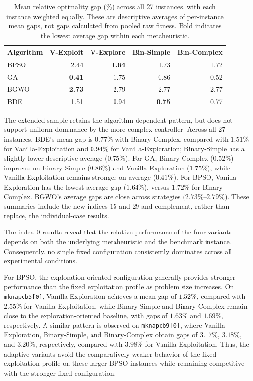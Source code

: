 \documentclass[journal,article,submit,moreauthors]{Definitions/mdpi}
\begin{document}
\begin{table}[htbp]
  \centering
  \small
  \caption{Mean relative optimality gap (\%) across all 27 instances,
  with each instance weighted equally. These are descriptive averages of
  per-instance mean gaps, not gaps calculated from pooled raw fitness.
  Bold indicates the lowest average gap within each metaheuristic.}
  \label{tab:gap_all_instances}
  \begin{tabular}{lrrrr}
    \toprule
    Algorithm & V-Exploit & V-Explore & Bin-Simple & Bin-Complex \\
    \midrule
    BPSO & 2.44 & \textbf{1.64} & 1.73 & 1.72 \\
    GA & \textbf{0.41} & 1.75 & 0.86 & 0.52 \\
    BGWO & \textbf{2.73} & 2.79 & 2.77 & 2.77 \\
    BDE & 1.51 & 0.94 & \textbf{0.75} & 0.77 \\
    \bottomrule
  \end{tabular}
\end{table}

The extended sample retains the algorithm-dependent pattern, but does not
support uniform dominance by the more complex controller. Across all 27
instances, BDE's mean gap is $0.77\%$ with Binary-Complex, compared with
$1.51\%$ for Vanilla-Exploitation and $0.94\%$ for Vanilla-Exploration;
Binary-Simple has a slightly lower descriptive average ($0.75\%$).
For GA, Binary-Complex ($0.52\%$) improves on Binary-Simple ($0.86\%$)
and Vanilla-Exploration ($1.75\%$), while Vanilla-Exploitation remains
stronger on average ($0.41\%$). For BPSO, Vanilla-Exploration has the
lowest average gap ($1.64\%$), versus $1.72\%$ for Binary-Complex.
BGWO's average gaps are close across strategies ($2.73\%$--$2.79\%$).
These summaries include the new indices $15$ and $29$ and complement,
rather than replace, the individual-case results.

The index-$0$ results reveal that the relative performance of the four variants depends
on both the underlying metaheuristic and the benchmark instance. Consequently,
no single fixed configuration consistently dominates across all experimental
conditions.

For BPSO, the exploration-oriented configuration generally provides stronger
performance than the fixed exploitation profile as problem size increases.
On \texttt{mknapcb5[0]}, Vanilla-Exploration achieves a mean gap of $1.52\%$,
compared with $2.55\%$ for Vanilla-Exploitation, while Binary-Simple and
Binary-Complex remain close to the exploration-oriented baseline, with gaps
of $1.63\%$ and $1.69\%$, respectively. A similar pattern is observed on
\texttt{mknapcb9[0]}, where Vanilla-Exploration, Binary-Simple, and
Binary-Complex obtain gaps of $3.17\%$, $3.18\%$, and $3.20\%$,
respectively, compared with $3.98\%$ for Vanilla-Exploitation. Thus, the
adaptive variants avoid the comparatively weaker behavior of the fixed
exploitation profile on these larger BPSO instances while remaining
competitive with the stronger fixed configuration.
\end{document}
